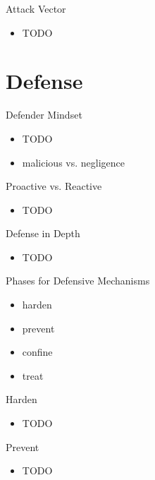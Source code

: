 \documentclass{curs}
\begin{document}
\begin{frame}{Attack Vector}
  \begin{itemize}
    \item TODO
  \end{itemize}
\end{frame}


\section{Defense}

\begin{frame}{Defender Mindset}
  \begin{itemize}
    \item TODO
    \item malicious vs. negligence
  \end{itemize}
\end{frame}

\begin{frame}{Proactive vs. Reactive}
  \begin{itemize}
    \item TODO
  \end{itemize}
\end{frame}

\begin{frame}{Defense in Depth}
  \begin{itemize}
    \item TODO
  \end{itemize}
\end{frame}

\begin{frame}{Phases for Defensive Mechanisms}
  \begin{itemize}
    \item harden
    \item prevent
    \item confine
    \item treat
  \end{itemize}
\end{frame}

\begin{frame}{Harden}
  \begin{itemize}
    \item TODO
  \end{itemize}
\end{frame}

\begin{frame}{Prevent}
  \begin{itemize}
    \item TODO
  \end{itemize}
\end{frame}
\end{document}
